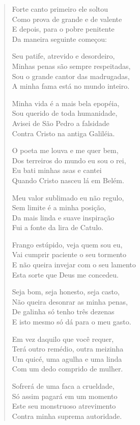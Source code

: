 \begin{verse}
Forte canto primeiro ele soltou\\
Como prova de grande e de valente\\
E depois, para o pobre penitente\\
Da maneira seguinte começou:

Seu patife, atrevido e desordeiro,\\
Minhas penas são sempre respeitadas,\\
Sou o grande cantor das madrugadas,\\
A minha fama está no mundo inteiro.

Minha vida é a mais bela epopéia,\\
Sou querido de toda humanidade,\\
Avisei de São Pedro a falsidade\\
Contra Cristo na antiga Galiléia.

O poeta me louva e me quer bem,\\
Dos terreiros do mundo eu sou o rei,\\
Eu bati minhas asas e cantei\\
Quando Cristo nasceu lá em Belém.

Meu valor sublimado eu não regulo,\\
Sem limite é a minha posição,\\
Da mais linda e suave inspiração\\
Fui a fonte da lira de Catulo.

Frango estúpido, veja quem sou eu,\\
Vai cumprir paciente o seu tormento\\
E não queira invejar com o seu lamento\\
Esta sorte que Deus me concedeu.

Seja bom, seja honesto, seja casto,\\
Não queira desonrar as minha penas,\\
De galinha só tenho três dezenas\\
E isto mesmo só dá para o meu gasto.

Em vez daquilo que você requer,\\
Terá outro remédio, outra meizinha\\
Um quicé, uma agulha e uma linda\\
Com um dedo comprido de mulher.

Sofrerá de uma faca a crueldade,\\
Só assim pagará em um momento\\
Este seu monstruoso atrevimento\\
Contra minha suprema autoridade.


\end{verse}
